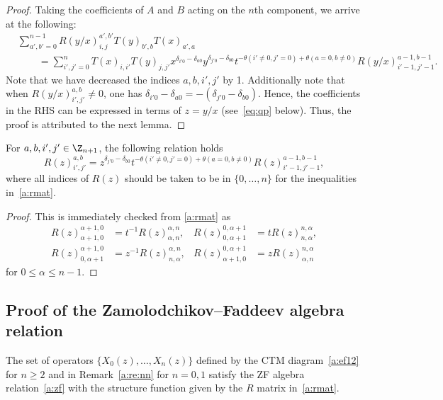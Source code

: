 \begin{proof}
Taking the coefficients of $A$ and $B$ acting on the $n$th component, we arrive at the following:
\begin{align*}
&\sum_{a',b'=0}^{n-1}R(y/x)_{i, j}^{a', b'}T(y)_{b',b}T(x)_{a',a} \\
& \hspace{25pt} = \sum_{i',j'=0}^nT(x)_{i,i'}T(y)_{j,j'} x^{\delta_{i'0}-\delta_{a0}}y^{\delta_{j'0}-\delta_{b0}}
t^{-\theta(i'\ne0,j'=0)+\theta(a=0,b\ne0)}R(y/x)_{i'-1,j'-1}^{a-1,b-1}.
\end{align*}
Note that we have decreased the indices $a,b,i',j'$ by 1.
Additionally note that when $R(y/x)_{i', j'}^{a, b}\neq 0$, one has $\delta_{i'0}-\delta_{a0}=-(\delta_{j'0}-\delta_{b0})$.
Hence, the coefficients in the RHS can be expressed in terms of $z = y/x$ (see~\eqref{eq:qp} below).
Thus, the proof is attributed to the next lemma.
\end{proof}



\begin{lemma}
For $a,b,i',j' \in \Z_{n+1}$, the following relation holds
\begin{equation}
\label{eq:qp}
R(z)_{i', j'}^{a, b} = z^{\delta_{j'0}-\delta_{b0}} t^{-\theta(i'\ne0,j'=0)+\theta(a=0,b\ne0)}R(z)_{i'-1,j'-1}^{a-1,b-1},
\end{equation}
where all indices of $R(z)$ should be taken to be in $\{0,\ldots, n\}$ for the inequalities in~\eqref{a:rmat}.
\end{lemma}

\begin{proof}
This is immediately checked from \eqref{a:rmat} as   
\begin{align*}
R(z)^{\alpha+1,0}_{\alpha+1,0}&=t^{-1}R(z)^{\alpha, n}_{\alpha, n},
&
R(z)^{0,\alpha+1}_{0,\alpha+1}&=tR(z)^{n,\alpha}_{n,\alpha},
\\
R(z)^{\alpha+1,0}_{0,\alpha+1} &= z^{-1}R(z)^{\alpha, n}_{n,\alpha},
&
R(z)_{\alpha+1,0}^{0,\alpha+1} &= zR(z)_{\alpha, n}^{n,\alpha}
\end{align*}
for $0 \le \alpha \le n-1$.
\end{proof}

\subsection{Proof of the Zamolodchikov--Faddeev algebra relation}

\begin{theo}\label{a:th:zf}
The set of operators $\{X_0(z), \ldots, X_n(z)\}$ defined by the CTM diagram~\eqref{a:ef12} for $n \ge 2$ and in Remark~\ref{a:re:nn} for $n=0,1$ satisfy the ZF algebra relation~\eqref{a:zf} with the structure function given by the $R$ matrix in~\eqref{a:rmat}.
\end{theo}

